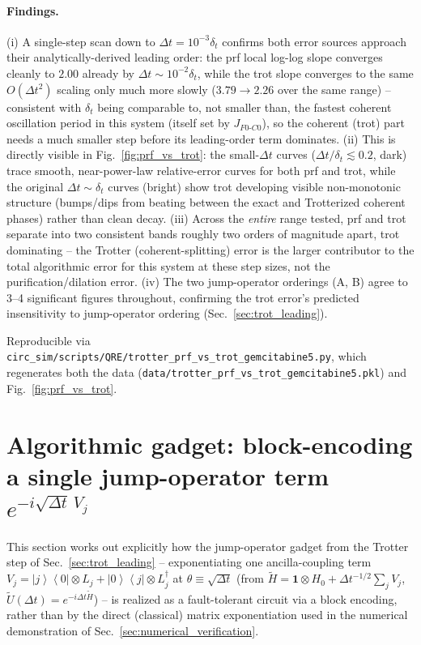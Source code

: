 \documentclass[11pt]{article}
\newcommand{\Dt}{\Delta t}
\newcommand{\Ht}{\tilde{H}}
\renewcommand{\ket}[1]{\left| #1 \right\rangle}
\renewcommand{\bra}[1]{\left\langle #1 \right|}
\begin{document}
\paragraph{Findings.} (i) A single-step scan down to $\Dt=10^{-3}\delta_t$ confirms both error sources approach their analytically-derived leading order: the prf local log-log slope converges cleanly to $2.00$ already by $\Dt\sim10^{-2}\delta_t$, while the trot slope converges to the same $O(\Dt^2)$ scaling only much more slowly ($3.79\to2.26$ over the same range) -- consistent with $\delta_t$ being comparable to, not smaller than, the fastest coherent oscillation period in this system (itself set by $J_{F0\text{-}C0}$), so the coherent (trot) part needs a much smaller step before its leading-order term dominates. (ii) This is directly visible in Fig.~\ref{fig:prf_vs_trot}: the small-$\Dt$ curves ($\Dt/\delta_t\lesssim0.2$, dark) trace smooth, near-power-law relative-error curves for both prf and trot, while the original $\Dt\sim\delta_t$ curves (bright) show trot developing visible non-monotonic structure (bumps/dips from beating between the exact and Trotterized coherent phases) rather than clean decay. (iii) Across the \emph{entire} range tested, prf and trot separate into two consistent bands roughly two orders of magnitude apart, trot dominating -- the Trotter (coherent-splitting) error is the larger contributor to the total algorithmic error for this system at these step sizes, not the purification/dilation error. (iv) The two jump-operator orderings (A, B) agree to 3--4 significant figures throughout, confirming the trot error's predicted insensitivity to jump-operator ordering (Sec.~\ref{sec:trot_leading}).

Reproducible via \texttt{circ\_sim/scripts/QRE/trotter\_prf\_vs\_trot\_gemcitabine5.py}, which regenerates both the data (\texttt{data/trotter\_prf\_vs\_trot\_gemcitabine5.pkl}) and Fig.~\ref{fig:prf_vs_trot}.

\section{Algorithmic gadget: block-encoding a single jump-operator term \texorpdfstring{$e^{-i\sqrt{\Dt}\,V_j}$}{e\^{}(-i sqrt(Dt) Vj)}}
\label{sec:Vj_block_encoding}

This section works out explicitly how the jump-operator gadget from the Trotter step of Sec.~\ref{sec:trot_leading} -- exponentiating one ancilla-coupling term $V_j=\ket{j}\bra{0}\otimes L_j+\ket{0}\bra{j}\otimes L_j^\dagger$ at $\theta\equiv\sqrt{\Dt}$ (from $\Ht=\mathbf{1}\otimes H_0+\Dt^{-1/2}\sum_jV_j$, $\tilde U(\Dt)=e^{-i\Dt\Ht}$) -- is realized as a fault-tolerant circuit via a block encoding, rather than by the direct (classical) matrix exponentiation used in the numerical demonstration of Sec.~\ref{sec:numerical_verification}.
\end{document}
